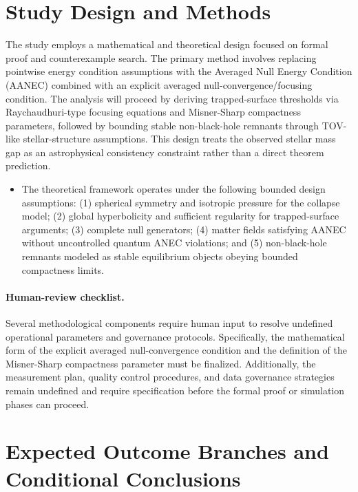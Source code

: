 \documentclass[conference]{IEEEtran}
\begin{document}
\section{Study Design and Methods}
The study employs a mathematical and theoretical design focused on formal proof and counterexample search. The primary method involves replacing pointwise energy condition assumptions with the Averaged Null Energy Condition (AANEC) combined with an explicit averaged null-convergence/focusing condition. The analysis will proceed by deriving trapped-surface thresholds via Raychaudhuri-type focusing equations and Misner-Sharp compactness parameters, followed by bounding stable non-black-hole remnants through TOV-like stellar-structure assumptions. This design treats the observed stellar mass gap as an astrophysical consistency constraint rather than a direct theorem prediction.

\begin{itemize}
\item The theoretical framework operates under the following bounded design assumptions: (1) spherical symmetry and isotropic pressure for the collapse model; (2) global hyperbolicity and sufficient regularity for trapped-surface arguments; (3) complete null generators; (4) matter fields satisfying AANEC without uncontrolled quantum ANEC violations; and (5) non-black-hole remnants modeled as stable equilibrium objects obeying bounded compactness limits.
\end{itemize}

\paragraph{Human-review checklist.} Several methodological components require human input to resolve undefined operational parameters and governance protocols. Specifically, the mathematical form of the explicit averaged null-convergence condition and the definition of the Misner-Sharp compactness parameter must be finalized. Additionally, the measurement plan, quality control procedures, and data governance strategies remain undefined and require specification before the formal proof or simulation phases can proceed.

\section{Expected Outcome Branches and Conditional Conclusions}
\end{document}
